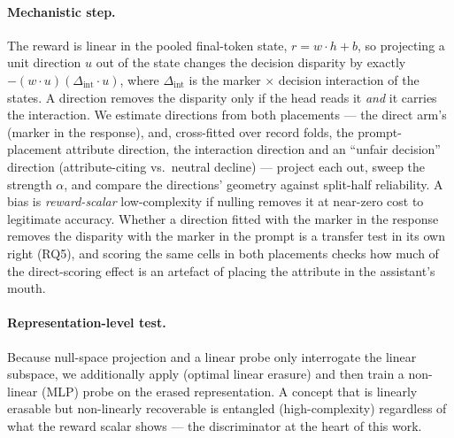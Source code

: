 \paragraph{Mechanistic step.} The reward is linear in the pooled final-token state, $r = w\cdot h + b$, so
projecting a unit direction $u$ out of the state changes the decision disparity by exactly
$-(w\cdot u)(\Delta_\text{int}\cdot u)$, where $\Delta_\text{int}$ is the marker $\times$ decision interaction
of the states. A direction removes the disparity only if the head reads it \emph{and} it carries the
interaction. We estimate \diffmean{} directions from both placements --- the direct arm's (marker in the
response), and, cross-fitted over record folds, the prompt-placement attribute direction, the interaction
direction and an ``unfair decision'' direction (attribute-citing vs.\ neutral decline) --- project each out,
sweep the strength $\alpha$, and compare the directions' geometry against split-half reliability. A bias is
\emph{reward-scalar} low-complexity if nulling removes it at near-zero cost to legitimate accuracy. Whether a
direction fitted with the marker in the response removes the disparity with the marker in the prompt is a
transfer test in its own right (RQ5), and scoring the same cells in both placements checks how much of the
direct-scoring effect is an artefact of placing the attribute in the assistant's mouth.

\paragraph{Representation-level test.} Because null-space projection and a linear probe only interrogate the
linear subspace, we additionally apply \leace{} (optimal linear erasure) and then train a non-linear (MLP)
probe on the erased representation. A concept that is linearly erasable but non-linearly recoverable is
entangled (high-complexity) regardless of what the reward scalar shows --- the discriminator at the heart of
this work.
